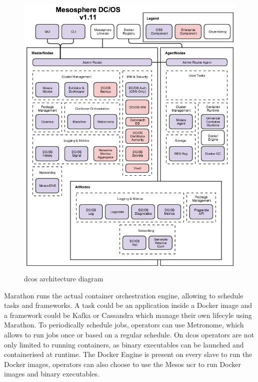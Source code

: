 \begin{figure}
    \centering
    \includegraphics[width=1\columnwidth]{images/dcos-arch}
    \caption{\gls{dcos} architecture diagram\cite{dcos_arch}}
    \label{fig:dcos-arch}
\end{figure}

Marathon\cite{marathon} runs the actual container orchestration engine, allowing to schedule tasks and frameworks. A task could be an application inside a Docker image and a framework could be Kafka\cite{kafka} or Cassandra\cite{cassandra} which manage their own lifecyle using Marathon. To periodically schedule jobs, operators can use Metronome\cite{metronome}, which allows to run jobs once or based on a regular schedule. On \gls{dcos} operators are not only limited to running containers, as binary executables can be launched and containerised at runtime. The Docker Engine is present on every slave to run the Docker images, operators can also choose to use the Mesos \gls{ucr}\cite{ucr} to run Docker images and binary executables.

